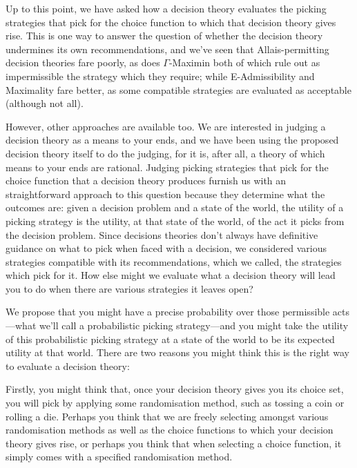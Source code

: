 \documentclass[a4paper]{article}
\newcommand{\todoold}[2][]{\todo[backgroundcolor=white,bordercolor=orange!10,linecolor=gray!10, #1,caption={},textcolor=gray]{Pre-rev: #2}}
\newcommand{\todooldinfo}[2][]{\todoold[#1]{#2}}
\newenvironment{CCM rewritten}
{\begingroup\color{blue}} %
{\endgroup}              %
\begin{document}
Up to this point, we have asked how a decision theory evaluates the picking strategies that pick for the choice function to which that decision theory gives rise. This is one way to answer the question of whether the decision theory undermines its own recommendations, and we've seen that Allais-permitting decision theories fare poorly, as does $\Gamma$-Maximin both of which rule out as impermissible the strategy which they require; while E-Admissibility and Maximality fare better, as some compatible strategies are evaluated as acceptable (although not all). \todoold{check that}

However, other approaches are available too. We are interested in judging a decision theory as a means to your ends, and we have been using the proposed decision theory itself to do the judging, for it is, after all, a theory of which means to your ends are rational. Judging picking strategies that pick for the choice function that a decision theory produces furnish us with an straightforward approach to this question because they determine what the outcomes are: given a decision problem and a state of the world, the utility of a picking strategy is the utility, at that state of the world, of the act it picks from the decision problem. Since decisions theories don't always have definitive guidance on what to pick when faced with a decision, we considered various strategies compatible with its recommendations, which we called, the strategies which pick for it. 
How else might we evaluate what a decision theory will lead you to do when there are various strategies %
it leaves open?

We propose that you might have a precise probability over those permissible acts---what we'll call a probabilistic picking strategy---and you might take the utility of this probabilistic picking strategy at a state of the world to be its expected utility at that world. There are two reasons you might think this is the right way to evaluate a decision theory: 

Firstly, you might think that, once your decision theory gives you its choice set, you will pick by applying some randomisation method, such as tossing a coin or rolling a die. Perhaps you think that we are freely selecting amongst various randomisation methods as well as the choice functions to which your decision theory gives rise, or perhaps you think that when selecting a choice function, it simply comes with a specified randomisation method. %
\end{document}
